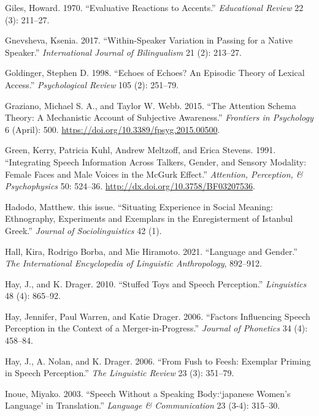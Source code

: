 \documentclass[
  letterpaper,
  DIV=11,
  numbers=noendperiod]{scrartcl}
\newlength{\cslhangindent}
\newenvironment{CSLReferences}[2] %
 {\begin{list}{}{%
  \setlength{\itemindent}{0pt}
  \setlength{\leftmargin}{0pt}
  \setlength{\parsep}{0pt}
  \ifodd #1
   \setlength{\leftmargin}{\cslhangindent}
   \setlength{\itemindent}{-1\cslhangindent}
  \fi
  \setlength{\itemsep}{#2\baselineskip}}}
 {\end{list}}
\begin{document}
\begin{CSLReferences}{1}{0}
Giles, Howard. 1970. {``Evaluative Reactions to Accents.''}
\emph{Educational Review} 22 (3): 211--27.

Gnevsheva, Ksenia. 2017. {``Within-Speaker Variation in Passing for a
Native Speaker.''} \emph{International Journal of Bilingualism} 21 (2):
213--27.

Goldinger, Stephen D. 1998. {``Echoes of Echoes? An Episodic Theory of
Lexical Access.''} \emph{Psychological Review} 105 (2): 251--79.

Graziano, Michael S. A., and Taylor W. Webb. 2015. {``The Attention
Schema Theory: A Mechanistic Account of Subjective Awareness.''}
\emph{Frontiers in Psychology} 6 (April): 500.
\url{https://doi.org/10.3389/fpsyg.2015.00500}.

Green, Kerry, Patricia Kuhl, Andrew Meltzoff, and Erica Stevens. 1991.
{``Integrating Speech Information Across Talkers, Gender, and Sensory
Modality: Female Faces and Male Voices in the McGurk Effect.''}
\emph{Attention, Perception, \& Psychophysics} 50: 524--36.
\url{http://dx.doi.org/10.3758/BF03207536}.

Hadodo, Matthew. this issue. {``Situating Experience in Social Meaning:
Ethnography, Experiments and Exemplars in the Enregisterment of Istanbul
Greek.''} \emph{Journal of Sociolinguistics} 42 (1).

Hall, Kira, Rodrigo Borba, and Mie Hiramoto. 2021. {``Language and
Gender.''} \emph{The International Encyclopedia of Linguistic
Anthropology}, 892--912.

Hay, J., and K. Drager. 2010. {``Stuffed Toys and Speech Perception.''}
\emph{Linguistics} 48 (4): 865--92.

Hay, Jennifer, Paul Warren, and Katie Drager. 2006. {``Factors
Influencing Speech Perception in the Context of a Merger-in-Progress.''}
\emph{Journal of Phonetics} 34 (4): 458--84.

Hay, J., A. Nolan, and K. Drager. 2006. {``From Fush to Feesh: Exemplar
Priming in Speech Perception.''} \emph{The Linguistic Review} 23 (3):
351--79.

Inoue, Miyako. 2003. {``Speech Without a Speaking Body:{`japanese
Women's Language'} in Translation.''} \emph{Language \& Communication}
23 (3-4): 315--30.


\end{CSLReferences}
\end{document}
